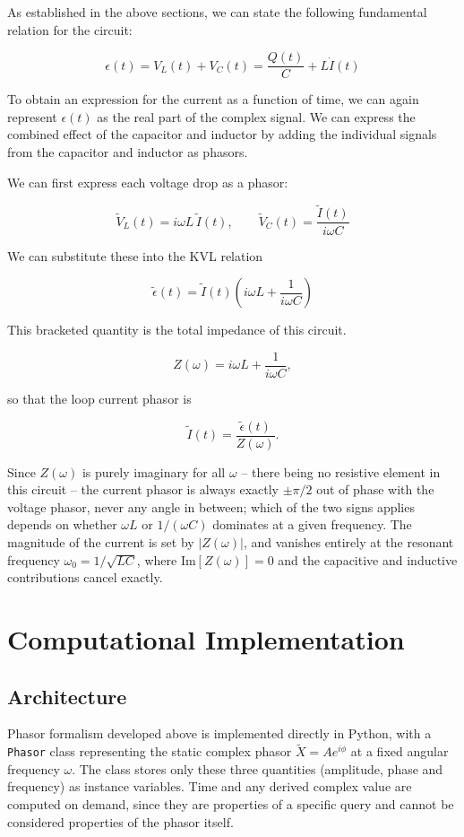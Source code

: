 \documentclass[11pt]{article}
\begin{document}
As established in the above sections, we can state the following fundamental relation for the circuit:

$$\epsilon(t) = V_L(t) + V_C(t) = \frac{Q(t)}{C} + L\dot{I}(t)$$

To obtain an expression for the current as a function of time, we can again represent $\epsilon(t)$ as the real part of the complex signal. We can express the combined effect of the capacitor and inductor by adding the individual signals from the capacitor and inductor as phasors.

We can first express each voltage drop as a phasor:

$$ \tilde{V}_L(t) = i\omega L\, \tilde{I}(t), \qquad \tilde{V}_C(t) = \frac{\tilde{I}(t)}{i\omega C} $$

We can substitute these into the KVL relation

$$ \tilde{\epsilon}(t) = \tilde{I}(t)\left(i\omega L + \frac{1}{i\omega C}\right) $$

This bracketed quantity is the total impedance of this circuit. 

$$ Z(\omega) = i\omega L + \frac{1}{i\omega C}, $$

so that the loop current phasor is
 
$$ \tilde{I}(t) = \frac{\tilde{\epsilon}(t)}{Z(\omega)}. $$

Since $Z(\omega)$ is purely imaginary for all $\omega$ -- there being no resistive element in this circuit -- the current phasor is always exactly $\pm\pi/2$ out of phase with the voltage phasor, never any angle in between; which of the two signs applies depends on whether $\omega L$ or $1/(\omega C)$ dominates at a given frequency. The magnitude of the current is set by $|Z(\omega)|$, and vanishes entirely at the resonant frequency $\omega_0 = 1/\sqrt{LC}$, where $\text{Im}[Z(\omega)] = 0$ and the capacitive and inductive contributions cancel exactly.

\section{Computational Implementation}

\subsection{Architecture}

Phasor formalism developed above is implemented directly in Python, with a \texttt{Phasor} class representing the static complex phasor $\tilde{X} = Ae^{i\phi}$ at a fixed angular frequency $\omega$. The class stores only these three quantities (amplitude, phase and frequency) as instance variables. Time and any derived complex value are computed on demand, since they are properties of a specific query and cannot be considered properties of the phasor itself.
\end{document}

